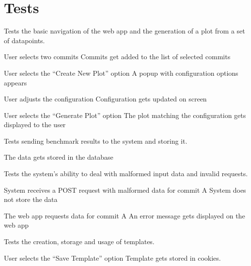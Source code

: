 \section{Tests}


Tests the basic navigation of the web app and the generation of a \gls{plot} from a set of datapoints.

{User selects two commits}
{Commits get added to the list of selected commits}

{User selects the \enquote{Create New Plot} option}
{A popup with configuration options appears}

{User adjusts the configuration}
{Configuration gets updated on screen}

{User selects the \enquote{Generate Plot} option}
{The \gls{plot} matching the configuration gets displayed to the user}


Tests sending \glspl{benchmark result} to the system and storing it.

{The data gets stored in the database}


Tests the system's ability to deal with malformed input data and invalid requests.

{System receives a POST request with malformed data for commit A}
{System does not store the data}

{The web app requests data for commit A}
{An error message gets displayed on the web app}


Tests the creation, storage and usage of templates.

{User selects the \enquote{Save Template} option}
{Template gets stored in cookies.}


